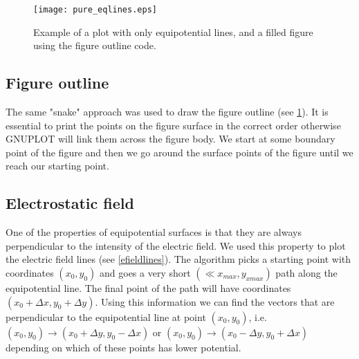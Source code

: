 \documentclass[aps,twocolumn,pre,nofootinbib,10pt]{revtex4-1}
\begin{document}
\begin{figure}[h]
\begin{center}
\texttt{[image: pure\_eqlines.eps]}
\caption{Example of a plot with only equipotential lines, and a filled figure using the figure outline code.}
\label{pureeq}
\end{center}
\end{figure}

\subsection{Figure outline}
The same "snake" approach was used to draw the figure outline (see \ref{pureeq}). It is essential to print the points on the figure surface in the correct order otherwise GNUPLOT will link them across the figure body. We start at some boundary point of the figure and then we go around the surface points of the figure until we reach our starting point. 




\subsection{Electrostatic field}
One of the properties of equipotential surfaces is that they are always perpendicular to the intensity of the electric field. We used this property to plot the electric field lines (see \ref{efieldlines}). The algorithm picks a starting point with coordinates \begin{math} (x_0,y_0) \end{math} and goes a very short \begin{math} (\ll x_{max},y_{xmax})\end{math} path along the equipotential line. The final point of the path will have coordinates \begin{math} (x_0+\Delta x, y_0 + \Delta y)\end{math}. Using this information we can find the vectors that are perpendicular to the equipotential line at point \begin{math} (x_0,y_0) \end{math}, i.e. \begin{math} (x_0,y_0) \rightarrow (x_0 + \Delta y, y_0 - \Delta x) \end{math} or \begin{math} (x_0,y_0) \rightarrow (x_0 - \Delta y, y_0 + \Delta x) \end{math} depending on which of these points has lower potential.
\end{document}
